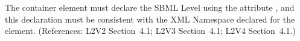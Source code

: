 The  container element must declare the SBML Level
using the attribute , and this declaration must be
consistent with the XML Namespace declared for the 
element.  (References: L2V2 Section~4.1; L2V3 Section~4.1; L2V4 Section~4.1.)
